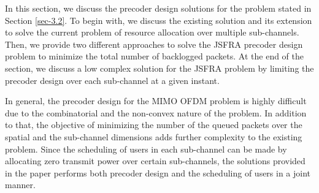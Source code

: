 
In this section, we discuss the precoder design solutions for the problem stated in Section \ref{sec-3.2}. To begin with, we discuss the existing solution and its extension to solve the current problem of resource allocation over multiple sub-channels. Then, we provide two different approaches to solve the \ac{JSFRA} precoder design problem to minimize the total number of backlogged packets. At the end of the section, we discuss a low complex solution for the \ac{JSFRA} problem by limiting the precoder design over each sub-channel at a given instant.

In general, the precoder design for the \ac{MIMO} \ac{OFDM} problem is highly difficult due to the combinatorial and the non-convex nature of the problem. In addition to that, the objective of minimizing the number of the queued packets over the spatial and the sub-channel dimensions adds further complexity to the existing problem. Since the scheduling of users in each sub-channel can be made by allocating zero transmit power over certain sub-channels, the solutions provided in the paper performs both precoder design and the scheduling of users in a joint manner.